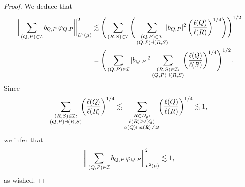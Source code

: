 \begin{proof}
We deduce that
\begin{align*}
\bigg\|\sum_{(Q,P)\in {\mathcal I}} b_{Q,P}\,{\varphi}_{Q,P}\bigg\|_{L^2(\mu)}^2 
& \lesssim
 \Bigg( \sum_{(R,S)\in{\mathcal I}} \Bigg(
\sum_{\substack{(Q,P)\in {\mathcal I}:\\ (Q,P)\dashv(R,S)}}\!\!\! |b_{Q,P}|^2 \,\bigg(\frac{\ell(Q)}{\ell(R)}\bigg)^{1/4}\Bigg)
\Bigg)^{1/2}\\
& =  \Bigg( \sum_{(Q,P)\in{\mathcal I}} |b_{Q,P}|^2 
\sum_{\substack{(R,S)\in {\mathcal I}:\\ (Q,P)\dashv(R,S)}}\!\!\bigg(\frac{\ell(Q)}{\ell(R)}\bigg)^{1/4}
\Bigg)^{1/2}.
\end{align*}
Since
$$\sum_{\substack{(R,S)\in {\mathcal I}:\\ (Q,P)\dashv(R,S)}}\!\!\bigg(\frac{\ell(Q)}{\ell(R)}\bigg)^{1/4}
\lesssim 
\sum_{\substack{R\in{\mathcal D}_\mu:\\ \ell(R)\geq \ell(Q)\\ a(Q)\cap a(R)\neq\varnothing}}\!\!\bigg(\frac{\ell(Q)}{\ell(R)}\bigg)^{1/4}\lesssim1,$$
we infer that
$$\bigg\|\sum_{(Q,P)\in {\mathcal I}} b_{Q,P}\,{\varphi}_{Q,P}\bigg\|_{L^2(\mu)}^2 \lesssim1,$$
as wished.
\end{proof}




\vv
